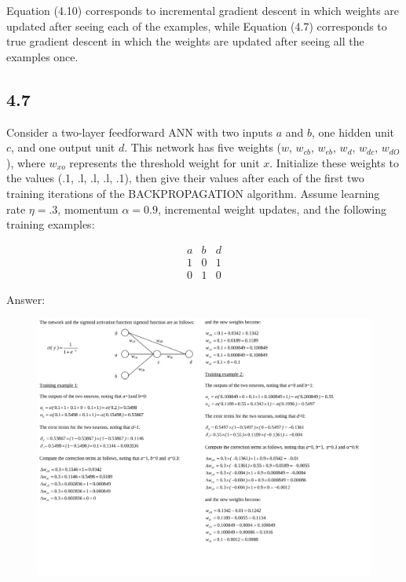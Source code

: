 Equation (4.10) corresponds to incremental gradient descent in which weights 
are updated after seeing each of the examples, while Equation (4.7) corresponds 
to true gradient descent in which the weights are updated after seeing all the 
examples once.

\subsection*{4.7}

Consider a two-layer feedforward ANN with two inputs $a$ and $b$, one hidden unit $c$, and one output unit $d$. This network has five weights ($w$, $w_{cb}$, $w_{eb}$, $w_{d}$, $w_{dc}$, $w_{dO}$), where $w_{xo}$ represents the threshold weight for unit $x$. Initialize these weights to the values (.1, .l, .l, .l, .1), then give their values after each of the first two training iterations of the BACKPROPAGATION algorithm. Assume learning rate $\eta=.3$, momentum $\alpha=0.9$, incremental weight updates, and the following training examples:

\begin{equation}
\begin{matrix}
    a&b&d\\
    1&0&1\\
    0&1&0   \nonumber
\end{matrix}
\end{equation}

Answer:

\begin{figure}[H]
    \centering
    \includegraphics[width=1\textwidth]{./2023April/solution4_7.pdf}
    \caption{}
    \label{solution4_7}
\end{figure}
